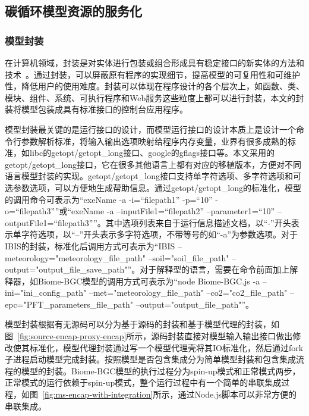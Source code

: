 \subsection{碳循环模型资源的服务化}
\label{subsec:ms-encap}
\subsubsection{模型封装}

在计算机领域，封装是对实体进行包装或组合形成具有稳定接口的新实体的方法和技术~\cite{胡迪2015地理模型的服务化封装方法研究}。通过封装，可以屏蔽原有程序的实现细节，提高模型的可复用性和可维护性，降低用户的使用难度。封装可以体现在程序设计的各个层次上，如函数、类、模块、组件、系统、可执行程序和Web服务这些粒度上都可以进行封装，本文的封装将模型包装成具有标准接口的控制台应用程序。

模型封装最关键的是运行接口的设计，而模型运行接口的设计本质上是设计一个命令行参数解析标准，将输入输出选项映射给程序内存变量，业界有很多成熟的标准，如libc的getopt/getopt\_long接口、google的gflags接口等。本文采用的getopt/getopt\_long接口，它在很多其他语言上都有对应的移植版本，方便对不同语言模型封装的实现。getopt/getopt\_long接口支持单字符选项、多字符选项和可选参数选项，可以方便地生成帮助信息。通过getopt/getopt\_long的标准化，模型的调用命令可表示为“exeName -a -i=``filepath1'' -p=``10'' -o=``filepath3''”或“exeName -a --inputFile1=``filepath2'' --parameter1=``10'' --outputFile1=``filepath3''”。其中选项列表来自于运行信息描述文档，以“-”开头表示单字符选项，以“--”开头表示多字符选项，不带等号的如“-a”为参数选项。对于IBIS的封装，标准化后调用方式可表示为“IBIS --meteorology="meteorology\_file\_path" --soil="soil\_file\_path" --output="output\_file\_save\_path"”。对于解释型的语言，需要在命令前面加上解释器，如Biome-BGC模型的调用方式可表示为“node Biome-BGC.js -a --ini="ini\_config\_path" --met="meteorology\_file\_path" --co2="co2\_file\_path" --epc="PFT\_parameters\_file\_path" --output="output\_file\_path"”。

模型封装根据有无源码可以分为基于源码的封装和基于模型代理的封装，如图~\ref{fig:source-encap-proxy-encap}所示，源码封装直接对模型输入输出接口做出修改使其标准化，模型代理封装通过写一个模型代理壳将其IO标准化，然后通过fork子进程启动模型完成封装。按照模型是否包含集成分为简单模型封装和包含集成流程的模型的封装。Biome-BGC模型的执行过程分为spin-up模式和正常模式两步，正常模式的运行依赖于spin-up模式，整个运行过程中有一个简单的串联集成过程，如图~\ref{fig:ms-encap-with-integration}所示，通过Node.js脚本可以非常方便的串联集成。


